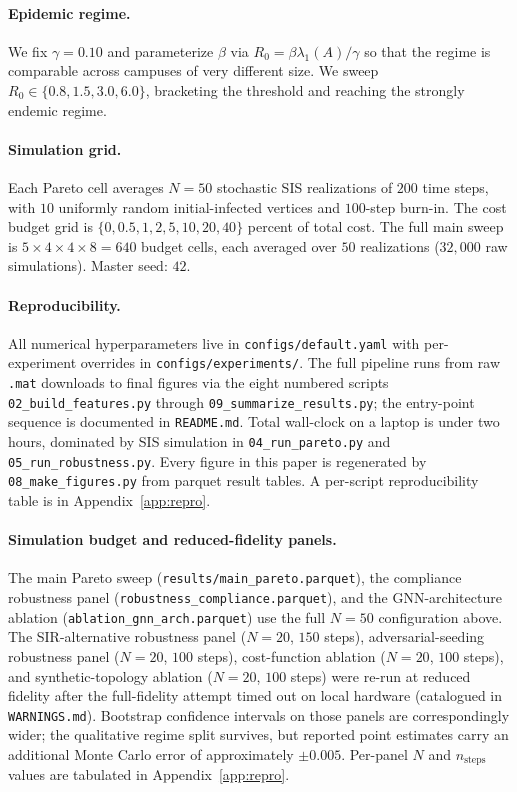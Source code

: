 \documentclass{article}
\begin{document}
\paragraph{Epidemic regime.} We fix $\gamma = 0.10$ and parameterize
$\beta$ via $R_0 = \beta \lambda_1(A) / \gamma$ so that the regime is
comparable across campuses of very different size. We sweep
$R_0 \in \{0.8, 1.5, 3.0, 6.0\}$, bracketing the threshold and
reaching the strongly endemic regime.

\paragraph{Simulation grid.} Each Pareto cell averages $N = 50$
stochastic SIS realizations of $200$ time steps, with $10$ uniformly
random initial-infected vertices and $100$-step burn-in. The cost
budget grid is $\{0, 0.5, 1, 2, 5, 10, 20, 40\}$ percent of total
cost. The full main sweep is $5 \times 4 \times 4 \times 8 = 640$
budget cells, each averaged over $50$ realizations
($32{,}000$ raw simulations). Master seed: $42$.

\paragraph{Reproducibility.} All numerical hyperparameters live in
\texttt{configs/default.yaml} with per-experiment overrides in
\texttt{configs/experiments/}. The full pipeline runs from raw
\texttt{.mat} downloads to final figures via the eight numbered
scripts \texttt{02\_build\_features.py} through
\texttt{09\_summarize\_results.py}; the entry-point sequence is
documented in \texttt{README.md}. Total wall-clock on a laptop is
under two hours, dominated by SIS simulation in
\texttt{04\_run\_pareto.py} and \texttt{05\_run\_robustness.py}.
Every figure in this paper is regenerated by
\texttt{08\_make\_figures.py} from parquet result tables. A
per-script reproducibility table is in Appendix~\ref{app:repro}.

\paragraph{Simulation budget and reduced-fidelity panels.}
The main Pareto sweep
(\texttt{results/main\_pareto.parquet}), the compliance robustness
panel (\texttt{robustness\_compliance.parquet}), and the
GNN-architecture ablation (\texttt{ablation\_gnn\_arch.parquet}) use
the full $N = 50$ configuration above. The SIR-alternative
robustness panel ($N = 20$, $150$ steps), adversarial-seeding
robustness panel ($N = 20$, $100$ steps), cost-function ablation
($N = 20$, $100$ steps), and synthetic-topology ablation ($N = 20$,
$100$ steps) were re-run at reduced fidelity after the full-fidelity
attempt timed out on local hardware (catalogued in
\texttt{WARNINGS.md}). Bootstrap confidence intervals on those
panels are correspondingly wider; the qualitative regime split
survives, but reported point estimates carry an additional Monte
Carlo error of approximately $\pm 0.005$. Per-panel $N$ and
$n_{\mathrm{steps}}$ values are tabulated in
Appendix~\ref{app:repro}.
\end{document}
